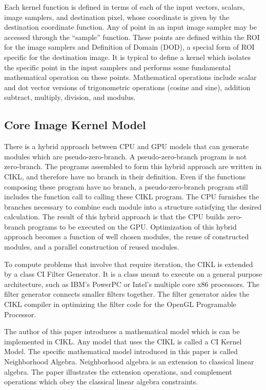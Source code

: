 \documentclass[11pt]{article}
\begin{document}
Each kernel function is defined in terms of each of the input vectors, scalars, image samplers, and  destination pixel, whose coordinate is given by the destination coordinate function.  
Any of point in an input image sampler may be accessed through the ``sample'' function.  These points are defined within the ROI for the image samplers and Definition of Domain (DOD), a special form of ROI specific for the destination image.  It is typical to define a kernel which isolates the specific point in the input samplers and performs some fundamental mathematical operation on these points.  Mathematical operations include scalar and dot vector versions of  trigonometric operations (cosine and sine), addition  subtract, multiply, division, and modulus.



\subsection{Core Image Kernel Model}
There is a hybrid approach between CPU and GPU models that can generate modules which are pseudo-zero-branch.  
A pseudo-zero-branch program is not zero-branch.  The programs assembled to form this hybrid approach are written in CIKL, and therefore have no branch in their definition.   Even if the functions composing these program have no branch, a pseudo-zero-branch program still includes the function call to calling these CIKL program.  
The CPU furnishes the branches necessary to combine each module into a structure satisfying the desired calculation.  The result of this hybrid approach is that the CPU builds zero-branch programs to be executed on the GPU.   Optimization of this hybrid approach becomes a function of well chosen modules, the reuse of constructed modules, and a parallel construction of reused modules.


To compute problems that involve that require iteration, the CIKL is extended by a class CI Filter Generator.  It is a class meant to execute on a general purpose architecture, such as IBM's PowerPC or Intel's multiple core x86 processors.  The filter generator connects smaller filters together.  The filter generator aides the CIKL compiler in optimizing the filter code for the OpenGL Programable Processor.

The author of this paper introduces a mathematical model which is can be implemented in CIKL.  Any model that uses the CIKL is called a CI Kernel Model.  The specific mathematical model introduced in this paper is called Neighborhood Algebra.  Neighborhood algebra is an extension to classical linear algebra.  The paper illustrates the extension operations, and complement operations which obey the classical linear algebra constraints.  
\end{document}
